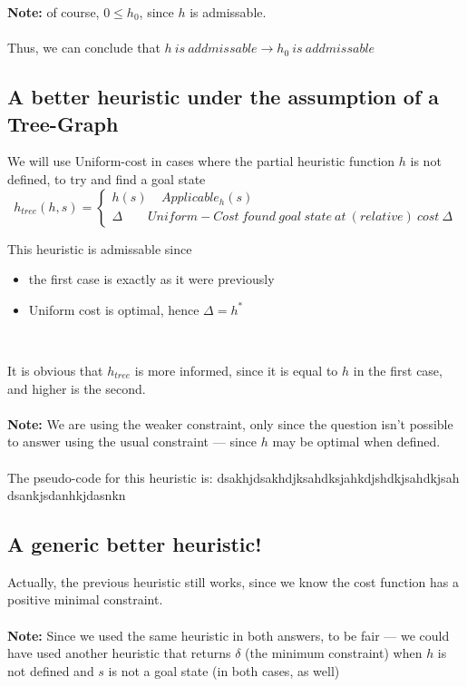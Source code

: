 \documentclass{article}
\begin{document}
\textbf{Note: } of course, $0 \leq h_0$, since $h$ is admissable. \\ \\

Thus, we can conclude that $ h\ is\ addmissable \rightarrow h_0\ is\ addmissable $

\subsection*{A better heuristic under the assumption of a Tree-Graph}
We will use Uniform-cost in cases where the partial heuristic function $h$ is not defined, to try and find a goal state
\[
  h_{tree}(h,s)=\begin{cases}
               h(s) \ \ \ \ \  Applicable_h(s) \\
               \Delta \ \ \ \ \ \ \ \  \  Uniform-Cost\ found\ goal\ state\ at\ (relative)\ cost\ \Delta
            \end{cases}
\]

This heuristic is admissable since
\begin{itemize}
\item the first case is exactly as it were previously
\item Uniform cost is optimal, hence $\Delta = h^* $
\end{itemize}
\ 

It is obvious that $h_{tree}$ is more informed, since it is equal to $h$ in the first case, and higher is the second.
\\~\\
\textbf{Note: } We are using the weaker constraint, only since the question isn't possible to answer using the usual constraint --- since $h$ may be optimal when defined.
\\~\\

The pseudo-code for this heuristic is:
dsakhjdsakhdjksahdksjahkdjshdkjsahdkjsah dsankjsdanhkjdasnkn

\subsection*{A generic better heuristic!}
Actually, the previous heuristic still works, since we know the cost function has a positive minimal constraint.
\\~\\
\textbf{Note: } Since we used the same heuristic in both answers, to be fair --- we could have used another heuristic that returns $\delta$ (the minimum constraint) when $h$ is not defined and $s$ is not a goal state (in both cases, as well)
\end{document}
